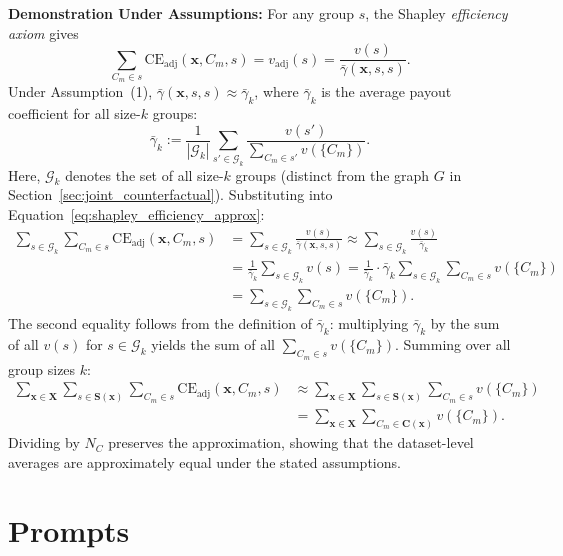 \begin{math_box}[label=ma:dataset_average_preservation]
	\smallskip
	\textbf{Demonstration Under Assumptions:} For any group $s$, the Shapley \emph{efficiency axiom} gives
	\begin{equation}
		\label{eq:shapley_efficiency_approx}
		\sum_{C_m \in s} \mathrm{CE}_{\text{adj}}(\mathbf{x}, C_m, s) = v_{\text{adj}}(s) = \frac{v(s)}{\bar\gamma(\mathbf{x},s,s)}.
	\end{equation}
	Under Assumption~(1), $\bar\gamma(\mathbf{x},s,s) \approx \bar\gamma_k$, where $\bar\gamma_k$ is the average payout coefficient for all size-$k$ groups:
	\begin{equation*}
		\bar\gamma_k := \frac{1}{|{\mathcal G}_k|} \sum_{s' \in {\mathcal G}_k} \frac{v(s')}{\sum_{C_m \in s'} v(\{C_m\})}.
	\end{equation*}
	Here, ${\mathcal G}_k$ denotes the set of all size-$k$ groups (distinct from the graph $G$ in Section~\ref{sec:joint_counterfactual}). Substituting into Equation~\ref{eq:shapley_efficiency_approx}:
	\begin{align*}
		\sum_{s \in {\mathcal G}_k} \sum_{C_m \in s} \mathrm{CE}_{\text{adj}}(\mathbf{x}, C_m, s) & = \sum_{s \in {\mathcal G}_k} \frac{v(s)}{\bar\gamma(\mathbf{x},s,s)} \approx \sum_{s \in {\mathcal G}_k} \frac{v(s)}{\bar\gamma_k}                           \\
		                                                                                          & = \frac{1}{\bar\gamma_k} \sum_{s \in {\mathcal G}_k} v(s) = \frac{1}{\bar\gamma_k} \cdot \bar\gamma_k \sum_{s \in {\mathcal G}_k} \sum_{C_m \in s} v(\{C_m\}) \\
		                                                                                          & = \sum_{s \in {\mathcal G}_k} \sum_{C_m \in s} v(\{C_m\}).
	\end{align*}
	The second equality follows from the definition of $\bar\gamma_k$: multiplying $\bar\gamma_k$ by the sum of all $v(s)$ for $s \in {\mathcal G}_k$ yields the sum of all $\sum_{C_m \in s} v(\{C_m\})$. Summing over all group sizes $k$:
	\begin{align*}
		\sum_{\mathbf{x} \in \mathbf{X}} \sum_{s \in \mathbf{S}(\mathbf{x})} \sum_{C_m \in s} \mathrm{CE}_{\text{adj}}(\mathbf{x}, C_m, s) & \approx \sum_{\mathbf{x} \in \mathbf{X}} \sum_{s \in \mathbf{S}(\mathbf{x})} \sum_{C_m \in s} v(\{C_m\}) \\
		                                                                                                                                   & = \sum_{\mathbf{x} \in \mathbf{X}} \sum_{C_m \in \mathbf{C}(\mathbf{x})} v(\{C_m\}).
	\end{align*}
	Dividing by $N_C$ preserves the approximation, showing that the dataset-level averages are approximately equal under the stated assumptions.
\end{math_box}

\chapter{Prompts}
